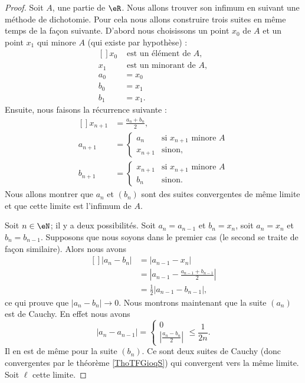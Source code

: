 \begin{proof}
	Soit $A$, une partie de $\eR$. Nous allons trouver son infimum en suivant une méthode de dichotomie. Pour cela nous allons construire trois suites en même temps de la façon suivante. D'abord nous choisissons un point $x_0$ de $A$ et un point $x_1$ qui minore $A$ (qui existe par hypothèse) :
	\begin{equation}
		\begin{aligned}[]
			x_0&\text{ est un élément de $A$},\\
			x_1&\text{ est un minorant de $A$},\\
			a_0&=x_0\\
			b_0&=x_1\\
			b_1&=x_1.
		\end{aligned}
	\end{equation}
	Ensuite, nous faisons la récurrence suivante :
	\begin{equation}
		\begin{aligned}[]
			x_{n+1}&=\frac{ a_n+b_n }{2},\\
			a_{n+1}&=\begin{cases}
				a_{n}	&	\text{si $x_{n+1}$ minore $A$}\\
				x_{n+1}	&	 \text{sinon},
			\end{cases}\\
			b_{n+1}&=\begin{cases}
				x_{n+1}	&	\text{si $x_{n+1}$ minore $A$}\\
				b_n	&	 \text{sinon}.
			\end{cases}
		\end{aligned}
	\end{equation}
    Nous allons montrer que \( a_n\) et \( (b_n)\) sont des suites convergentes de même limite et que cette limite est l'infimum de \( A\).

	Soit $n\in\eN$; il y a deux possibilités. Soit $a_n=a_{n-1}$ et $b_n=x_n$, soit $a_n=x_n$ et $b_n=b_{n-1}$. Supposons que nous soyons dans le premier cas (le second se traite de façon similaire). Alors nous avons
	\begin{equation}
		\begin{aligned}[]
			| a_n-b_n |&=| a_{n-1}-x_n |\\
			&=\left| a_{n-1}-\frac{ a_{n-1}+b_{n-1} }{2} \right| \\
			&=\frac{ 1 }{2}| a_{n-1}-b_{n-1} |,
		\end{aligned}
	\end{equation}
	ce qui prouve que $| a_n-b_n |\to 0$. Nous montrons maintenant que la suite \( (a_n)\) est de Cauchy. En effet nous avons
    \begin{equation}
        | a_n-a_{n-1} |=\begin{cases}
          0\\
          \left| \frac{ a_n -b_n}{ 2} \right|   
      \end{cases}\leq \frac{1}{ 2n }.
    \end{equation}
    Il en est de même pour la suite \( (b_n)\). Ce sont deux suites de Cauchy (donc convergentes par le théorème \ref{ThoTFGioqS}) qui convergent vers la même limite. Soit \( \ell\) cette limite.
    

\end{proof}
